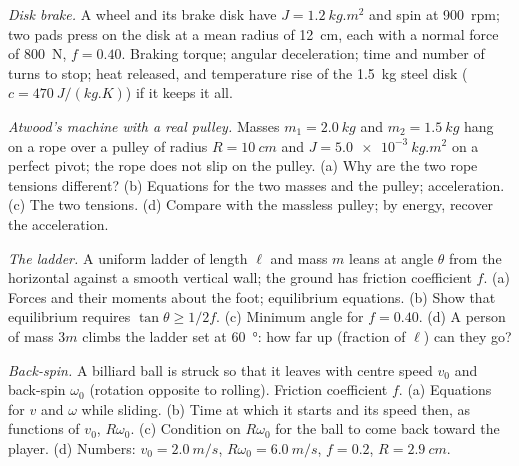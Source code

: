 \begin{exercise}[$\star\star$]\label{exo:b2:rigid-body-mechanics:6}
\emph{Disk brake.} A wheel and its brake disk have $J = \qty{1.2}{kg.m^2}$
and spin at \qty{900}{rpm}; two pads press on the disk at a mean radius
of \qty{12}{cm}, each with a normal force of \qty{800}{N}, $f = 0.40$.
Braking torque; angular deceleration; time and number of turns to stop;
heat released, and temperature rise of the \qty{1.5}{kg} steel disk
($c = \qty{470}{J/(kg.K)}$) if it keeps it all.
\end{exercise}

\begin{exercise}[$\star\star$]\label{exo:b2:rigid-body-mechanics:7}
\emph{Atwood's machine with a real pulley.} Masses $m_1 = \qty{2.0}{kg}$
and $m_2 = \qty{1.5}{kg}$ hang on a rope over a pulley of radius $R =
\qty{10}{cm}$ and  $J = \qty{5.0e-3}{kg.m^2}$ on a
perfect pivot; the rope does not slip on the pulley. (a) Why are the two
rope tensions different? (b) Equations for the two masses and the
pulley; acceleration. (c) The two tensions. (d) Compare with the
massless pulley; by energy, recover the acceleration.
\end{exercise}

\begin{exercise}[$\star\star$]\label{exo:b2:rigid-body-mechanics:8}
\emph{The ladder.} A uniform ladder of length $\ell$ and mass $m$ leans
at angle $\theta$ from the horizontal against a smooth vertical wall;
the ground has friction coefficient $f$. (a) Forces and their moments
about the foot; equilibrium equations. (b) Show that equilibrium requires
$\tan\theta \ge 1/2f$. (c) Minimum angle for $f = 0.40$. (d) A person of
mass $3m$ climbs the ladder set at \qty{60}{\degree}: how far up (fraction
of $\ell$) can they go?
\end{exercise}

\begin{exercise}[$\star\star$]\label{exo:b2:rigid-body-mechanics:9}
\emph{Back-spin.} A billiard ball is struck so that it leaves with
centre speed $v_0$ and back-spin $\omega_0$ (rotation opposite to
rolling). Friction coefficient $f$. (a) Equations for $v$ and $\omega$
while sliding. (b) Time at which it starts  and
its speed then, as functions of $v_0$, $R\omega_0$. (c) Condition on
$R\omega_0$ for the ball to come back toward the player. (d) Numbers:
$v_0 = \qty{2.0}{m/s}$, $R\omega_0 = \qty{6.0}{m/s}$, $f = 0.2$,
$R = \qty{2.9}{cm}$.
\end{exercise}

